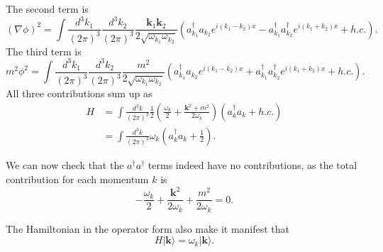 The second term is
\begin{equation}
	(\nabla \phi)^2 = \int \frac{d^{3} k_1}{(2\pi)^{3}} \frac{d^{3} k_2}{(2\pi)^{3}}
		\frac{\bm k_1 \bm k_2}{2\sqrt{\omega_{k_1}\omega_{k_2}}} \left(a^\dagger_{k_1}a_{k_2}e^{i(k_1-k_2)x} - a^\dagger_{k_1} a^\dagger_{k_2} e^{i(k_1+k_2)x} + h.c.\right).
\end{equation}
The third term is
\begin{equation}
	m^2 \phi^2 = \int \frac{d^{3} k_1}{(2\pi)^{3}} \frac{d^{3} k_2}{(2\pi)^{3}}
		\frac{m^2}{2\sqrt{\omega_{k_1}\omega_{k_2}}} \left(a^\dagger_{k_1}a_{k_2}e^{i(k_1-k_2)x} + a^\dagger_{k_1} a^\dagger_{k_2} e^{i(k_1+k_2)x} + h.c.\right).
\end{equation}
All three contributions sum up as
\begin{equation}
\begin{aligned}
	H &= \int \frac{d^3 k}{(2\pi)^3} \frac{1}{2}\left(\frac{\omega_k}{2} + \frac{\bm k^2+m^2}{2 \omega_k}\right) \left(a_k^\dagger a_k + h.c. \right) \\
	&= \int \frac{d^3 k}{(2\pi)^3} \omega_k \left(a_k^\dagger a_k +\frac{1}{2} \right).
\end{aligned}
\end{equation}

We can now check that the $a^\dagger a^\dagger$ terms indeed have no contributions, as the total contribution for each momentum $k$ is
\begin{equation}
	-\frac{\omega_k}{2} + \frac{\bm k^2}{2\omega_k} + \frac{m^2}{2\omega_k} = 0.
\end{equation}

The Hamiltonian in the operator form also make it manifest that
\begin{equation}
	H |\bm k\rangle = \omega_k |\bm k\rangle.
\end{equation}




